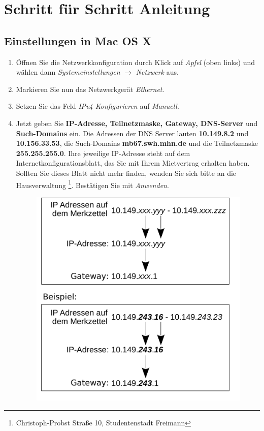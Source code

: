 \documentclass[a4paper,12pt]{scrartcl}
\begin{document}
\section*{Schritt für Schritt Anleitung}
\subsection*{Einstellungen in Mac OS X}
\begin{enumerate}
    \item Öffnen Sie die Netzwerkkonfiguration durch Klick auf \emph{Apfel} (oben links) und wählen dann \emph{Systemeinstellungen} $\rightarrow$ \emph{Netzwerk} aus.
    \item Markieren Sie nun das Netzwerkgerät \emph{Ethernet}.
    \item Setzen Sie das Feld \emph{IPv4 Konfigurieren} auf \emph{Manuell}.
	\item Jetzt geben Sie \textbf{IP-Adresse, Teilnetzmaske, Gateway, DNS-Server} und \textbf{Such-Domains} ein. Die Adressen der DNS Server lauten \textbf{10.149.8.2} und \textbf{10.156.33.53}, die Such-Domains \textbf{mb67.swh.mhn.de} und die Teilnetzmaske \textbf{255.255.255.0}. Ihre jeweilige IP-Adresse steht auf dem Internetkonfigurationsblatt, das Sie mit Ihrem Mietvertrag erhalten haben. Sollten Sie dieses Blatt nicht mehr finden, wenden Sie sich bitte an die Hausverwaltung \footnote{Christoph-Probst Straße 10, Studentenstadt Freimann}. Bestätigen Sie mit \emph{Anwenden}.
      \begin{figure}[h!]
      \centering
        \begin{minipage}[c]{0.38\linewidth}
          \centering
          \includegraphics[width=\linewidth,keepaspectratio]{Bilder/IP_Gerneric_mb}

\end{minipage}
\end{figure}
\end{enumerate}
\end{document}
